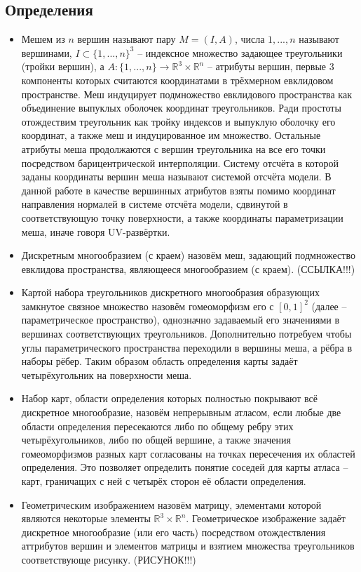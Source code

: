 \documentclass[12pt]{extarticle}
\begin{document}
\subsection{Определения}
\begin{itemize}
\item Мешем из $n$ вершин называют пару $M = (I, A)$, числа $1,...,n$ называют вершинами, $I \subset \{1, ..., n\}^3$ -- индексное множество задающее треугольники (тройки вершин), а $A: \{1, ..., n\} \rightarrow \mathbb{R}^3 \times \mathbb{R}^n$ -- атрибуты вершин, первые 3 компоненты которых считаются координатами в трёхмерном евклидовом пространстве. Меш индуцирует подмножество евклидового пространства как объединение выпуклых оболочек координат треугольников. Ради простоты отождествим треугольник как тройку индексов и выпуклую оболочку его координат, а также меш и индуцированное им множество. Остальные атрибуты меша продолжаются с вершин треугольника на все его точки посредством барицентрической интерполяции. Систему отсчёта в которой заданы координаты вершин меша называют системой отсчёта модели. В данной работе в качестве вершинных атрибутов взяты помимо координат направления нормалей в системе отсчёта модели, сдвинутой в соответствующую точку поверхности, а также координаты параметризации меша, иначе говоря UV-развёртки.
\item Дискретным многообразием (с краем) назовём меш, задающий подмножество евклидова пространства, являющееся многообразием (с краем). (ССЫЛКА!!!)
\item Картой набора треугольников дискретного многообразия образующих замкнутое связное множество назовём гомеоморфизм его с $[0,1]^2$ (далее -- параметрическое пространство), однозначно задаваемый его значениями в вершинах соответствующих треугольников. Дополнительно потребуем чтобы углы параметрического пространства переходили в вершины меша, а рёбра в наборы рёбер. Таким образом область определения карты задаёт четырёхугольник на поверхности меша.
\item Набор карт, области определения которых полностью покрывают всё дискретное многообразие, назовём непрерывным атласом, если любые две области определения пересекаются либо по общему ребру этих четырёхугольников, либо по общей вершине, а также значения гомеоморфизмов разных карт согласованы на точках пересечения их областей определения. Это позволяет определить понятие соседей для карты атласа -- карт, граничащих с ней с четырёх сторон её области определения.
\item Геометрическим изображением назовём матрицу, элементами которой являются некоторые элементы $\mathbb{R}^3\times \mathbb{R}^n$. Геометрическое изображение задаёт дискретное многообразие (или его часть) посредством отождествления аттрибутов вершин и элементов матрицы и взятием множества треугольников соответствующе рисунку. (РИСУНОК!!!)
\end{itemize}
\end{document}
